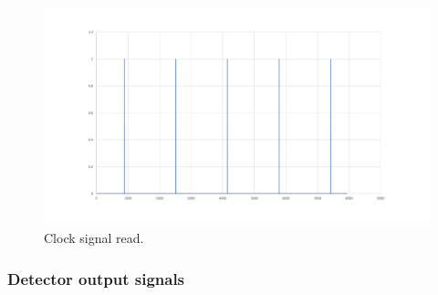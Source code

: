 \begin{refsection}
   
   
	
	\begin{figure}[H]
		\centering
		\includegraphics[width=1\linewidth]{./sdf/arduino_quantum_rx/figures/clockSignal2.pdf}
		\caption{Clock signal read.}
		\label{montage}
	\end{figure}

\subsubsection{Detector output signals}


\end{refsection}
